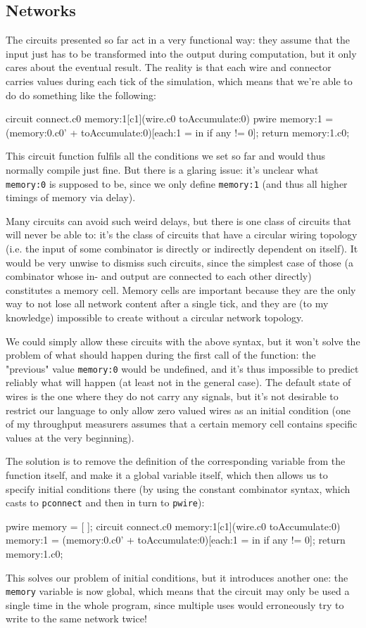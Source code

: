 \documentclass[landscape]{article}
\theoremstyle{plain}
\theoremstyle{definition}
\begin{document}
\subsection{Networks}
The circuits presented so far act in a very functional way: they assume that the input just has to be transformed into the output during computation, but it only cares about the eventual result. The reality is that each wire and connector carries values during each tick of the simulation, which means that we're able to do do something like the following:
\begin{langname}
circuit connect.c0 memory:1[c1](wire.c0 toAccumulate:0)
{
  pwire memory:1 = (memory:0.c0' + toAccumulate:0)[each:1 = in if any != 0];
  return memory:1.c0;
}
\end{langname}
This circuit function fulfils all the conditions we set so far and would thus normally compile just fine. But there is a glaring issue: it's unclear what \texttt{memory:0} is supposed to be, since we only define \texttt{memory:1} (and thus all higher timings of memory via delay).

Many circuits can avoid such weird delays, but there is one class of circuits that will never be able to: it's the class of circuits that have a circular wiring topology (i.e. the input of some combinator is directly or indirectly dependent on itself). It would be very unwise to dismiss such circuits, since the simplest case of those (a combinator whose in- and output are connected to each other directly) constitutes a memory cell. Memory cells are important because they are the only way to not lose all network content after a single tick, and they are (to my knowledge) impossible to create without a circular network topology.

We could simply allow these circuits with the above syntax, but it won't solve the problem of what should happen during the first call of the function: the "previous" value \texttt{memory:0} would be undefined, and it's thus impossible to predict reliably what will happen (at least not in the general case). The default state of wires is the one where they do not carry any signals, but it's not desirable to restrict our language to only allow zero valued wires as an initial condition (one of my throughput measurers assumes that a certain memory cell contains specific values at the very beginning).

The solution is to remove the definition of the corresponding variable from the function itself, and make it a global variable itself, which then allows us to specify initial conditions there (by using the constant combinator syntax, which casts to \texttt{pconnect} and then in turn to \texttt{pwire}):
\begin{langname}
pwire memory = [ ];
circuit connect.c0 memory:1[c1](wire.c0 toAccumulate:0)
{
  memory:1 = (memory:0.c0' + toAccumulate:0)[each:1 = in if any != 0];
  return memory:1.c0;
}
\end{langname}
This solves our problem of initial conditions, but it introduces another one: the \texttt{memory} variable is now global, which means that the circuit may only be used a single time in the whole program, since multiple uses would erroneously try to write to the same network twice!
\end{document}
